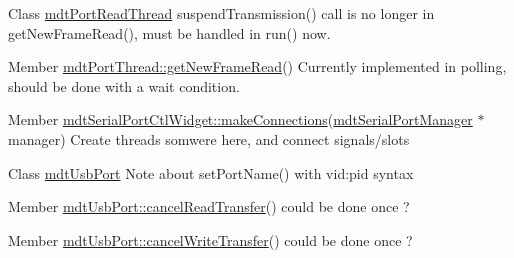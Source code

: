 \label{todo__todo000007}
\hypertarget{todo__todo000007}{}
 
\begin{DoxyDescription}
\item[Class \hyperlink{classmdt_port_read_thread}{mdtPortReadThread} ]suspendTransmission() call is no longer in getNewFrameRead(), must be handled in run() now. 
\end{DoxyDescription}

\label{todo__todo000008}
\hypertarget{todo__todo000008}{}
 
\begin{DoxyDescription}
\item[Member \hyperlink{classmdt_port_thread_a611211e56620ec9c699019452716e4fc}{mdtPortThread::getNewFrameRead}() ]Currently implemented in polling, should be done with a wait condition.
\end{DoxyDescription}

\label{todo__todo000028}
\hypertarget{todo__todo000028}{}
 
\begin{DoxyDescription}
\item[Member \hyperlink{classmdt_serial_port_ctl_widget_a9dce60a846cbf24d7ceab099ff147c18}{mdtSerialPortCtlWidget::makeConnections}(\hyperlink{classmdt_serial_port_manager}{mdtSerialPortManager} $\ast$manager) ]Create threads somwere here, and connect signals/slots 
\end{DoxyDescription}

\label{todo__todo000024}
\hypertarget{todo__todo000024}{}
 
\begin{DoxyDescription}
\item[Class \hyperlink{classmdt_usb_port}{mdtUsbPort} ]Note about setPortName() with vid:pid syntax 
\end{DoxyDescription}

\label{todo__todo000012}
\hypertarget{todo__todo000012}{}
 
\begin{DoxyDescription}
\item[Member \hyperlink{classmdt_usb_port_a3570b708f9f51408e4bbf2f61cc8c881}{mdtUsbPort::cancelReadTransfer}() ]could be done once ? 
\end{DoxyDescription}

\label{todo__todo000017}
\hypertarget{todo__todo000017}{}
 
\begin{DoxyDescription}
\item[Member \hyperlink{classmdt_usb_port_a7cbe1cd3649861aac5e6a14830f06cf9}{mdtUsbPort::cancelWriteTransfer}() ]could be done once ? 
\end{DoxyDescription}

